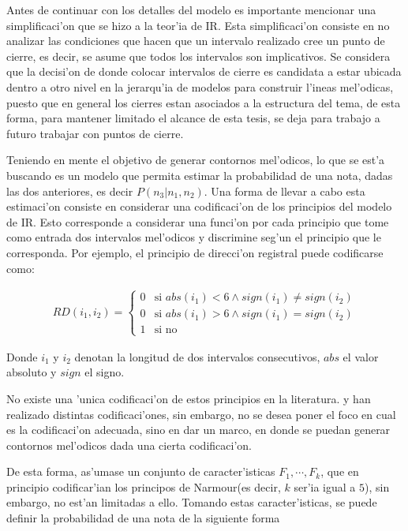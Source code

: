 Antes de continuar con los detalles del modelo es importante mencionar una simplificaci'on que se hizo a la teor'ia de IR.
Esta simplificaci'on consiste en no analizar las condiciones que hacen que un intervalo realizado
cree un punto de cierre, es decir, se asume que todos los intervalos son implicativos. Se considera que la decisi'on de donde colocar intervalos de cierre es candidata 
a estar ubicada dentro a otro nivel en la jerarqu'ia de modelos para construir l'ineas mel'odicas, puesto que en general los cierres estan asociados a la estructura
del tema, de esta forma, para mantener limitado el alcance de esta tesis, se deja para trabajo a futuro trabajar con puntos de cierre.

Teniendo en mente el objetivo de generar contornos mel'odicos, lo que se est'a buscando es un modelo que permita estimar la probabilidad de una nota, 
dadas las dos anteriores, es decir $P(n_3|n_1, n_2)$. Una forma de llevar a cabo esta estimaci'on consiste en considerar una codificaci'on de los principios del modelo de IR.
Esto corresponde a considerar una funci'on por cada principio que tome como entrada dos intervalos mel'odicos y discrimine seg'un el principio que le corresponda. Por ejemplo,
el principio de direcci'on registral puede codificarse como:

\begin{align*}
RD(i_1, i_2)= \left\{
 \begin{array}{rl}
  0 & \text{si } abs(i_1) < 6 \land sign(i_1) \ne sign(i_2) \\
  0 & \text{si } abs(i_1) > 6 \land sign(i_1) = sign(i_2) \\
  1 & \text{si no}
 \end{array} \right.
\end{align*}

Donde $i_1$ y $i_2$ denotan la longitud de dos intervalos consecutivos, $abs$ el valor absoluto y $sign$ el signo.

No existe una 'unica codificaci'on de estos principios en la literatura. \cite{PaieThesis} y \cite{Schellenberg97} han realizado distintas 
codificaci'ones, sin embargo, no se desea poner el foco en cual es la codificaci'on adecuada, sino en dar un marco, en donde se puedan generar contornos mel'odicos dada una cierta codificaci'on. 

De esta forma, as'umase un conjunto de caracter'isticas $F_1, \cdots, F_k$, que en principio codificar'ian los principos de Narmour(es decir, $k$ ser'ia igual a $5$), 
sin embargo, no est'an limitadas a ello. Tomando estas caracter'isticas, se puede definir la probabilidad de una nota de la siguiente forma


